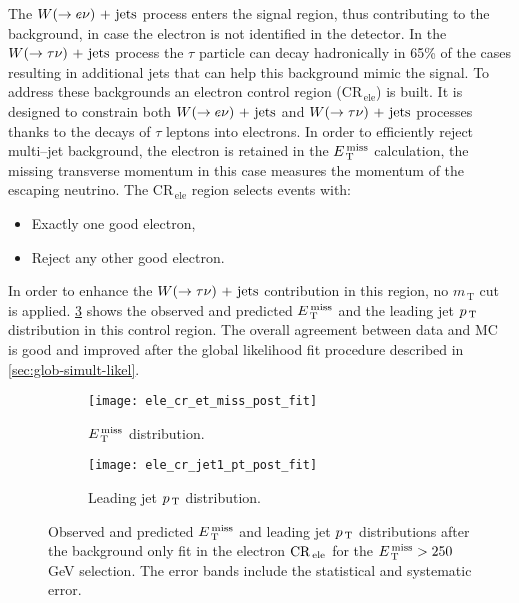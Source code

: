 The $W (\rightarrow e \nu)\mathrm{~+~jets}$ process enters the signal region, thus contributing to the
background, in case the electron is not identified in the detector. In the
$W (\rightarrow \tau \nu)\mathrm{~+~jets}$ process the $\tau$ particle can decay hadronically in 65\% of
the cases resulting in additional jets that can help this background mimic the
signal. To address these backgrounds an electron control region
(CR$_\mathrm{\, ele}$) is built. It is designed to constrain both
$W (\rightarrow e \nu)\mathrm{~+~jets}$ and $W (\rightarrow \tau \nu)\mathrm{~+~jets}$ processes thanks to the decays of $\tau$
leptons into electrons. In order to efficiently reject multi--jet background,
the electron is retained in the $E_\mathrm{\, T}^\mathrm{\, miss}$ calculation, the missing transverse
momentum in this case measures the momentum of the escaping neutrino. The
CR$_\mathrm{\, ele}$ region selects events with:
\begin{itemize}
\item Exactly one good electron,
\item Reject any other good electron.
\end{itemize}
In order to enhance the $W (\rightarrow \tau \nu)\mathrm{~+~jets}$ contribution in this region, no
$m_\mathrm{\, T}$ cut is applied. \cref{fig:ele_cr_plots} shows the observed and
predicted $E_\mathrm{\, T}^\mathrm{\, miss}$ and the leading jet $p_\mathrm{\, T}$ distribution in this control region. The
overall agreement between data and MC is good and improved after the global
likelihood fit procedure described in \cref{sec:glob-simult-likel}.
\begin{figure}[!h]
  \centering
  \begin{subfigure}[t]{.48\linewidth}
    \texttt{[image: ele\_cr\_et\_miss\_post\_fit]}
    \caption{$E_\mathrm{\, T}^\mathrm{\, miss}$ distribution.}
    \label{fig:ele_cr_et_miss_pre_fit}
  \end{subfigure}
  \begin{subfigure}[t]{.48\linewidth}
    \texttt{[image: ele\_cr\_jet1\_pt\_post\_fit]}
    \caption{Leading jet $p_\mathrm{\, T}$ distribution.}
    \label{fig:ele_cr_jet1_pt_pre_fit}
  \end{subfigure}
  \caption{Observed and predicted $E_\mathrm{\, T}^\mathrm{\, miss}$ and leading jet $p_\mathrm{\, T}$ distributions
    after the background only fit in the electron $\mathrm{CR}_\mathrm{\, ele}$ for the
    $E_\mathrm{\, T}^\mathrm{\, miss} > 250~$GeV selection. The error bands include the statistical and
    systematic error.}
  \label{fig:ele_cr_plots}
\end{figure}

